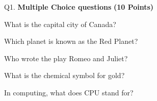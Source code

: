 \documentclass[a4paper,12pt]{exam}  %
\begin{document}
\begin{flushleft}
Q1. \textbf{Multiple Choice questions}\hspace*{\fill} \textbf{(10 Points)}
\end{flushleft}

\begin{questions}
\question What is the capital city of Canada?

\question Which planet is known as the Red Planet?

\question Who wrote the play Romeo and Juliet?

\question  What is the chemical symbol for gold?

\question In computing, what does CPU stand for?
\end{questions}

\newpage

\showallanswers
\end{document}
